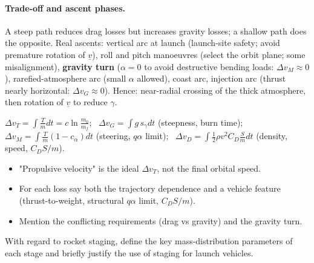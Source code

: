 \paragraph{Trade-off and ascent phases.} A steep path reduces drag losses but increases gravity losses; a shallow path does the
opposite. Real ascents: vertical arc at launch (launch-site safety; avoid premature rotation of $\underline v$), roll and pitch
manoeuvres (select the orbit plane; some misalignment), \textbf{gravity turn} ($\alpha=0$ to avoid destructive bending loads:
$\Delta v_M\approx0$), rarefied-atmosphere arc (small $\alpha$ allowed), coast arc, injection arc (thrust nearly horizontal:
$\Delta v_G\approx0$). Hence: near-radial crossing of the thick atmosphere, then rotation of $\underline v$ to reduce $\gamma$.

\begin{keyf}
$\Delta v_T=\displaystyle\int\frac Tm dt=c\ln\frac{m_0}{m_f}$; \ $\Delta v_G=\displaystyle\int g\,s_\gamma dt$ (steepness, burn time);
\ $\Delta v_M=\displaystyle\int\frac Tm(1-c_\alpha)dt$ (steering, $q\alpha$ limit); \ $\Delta v_D=\displaystyle\int\frac12\rho v^2C_D\frac{S}{m}dt$ (density, speed, $C_DS/m$).
\end{keyf}

\pitfalls
\begin{itemize}
\item "Propulsive velocity" is the ideal $\Delta v_T$, not the final orbital speed.
\item For each loss say both the trajectory dependence and a vehicle feature (thrust-to-weight, structural $q\alpha$ limit, $C_DS/m$).
\item Mention the conflicting requirements (drag vs gravity) and the gravity turn.
\end{itemize}


\begin{qbox}
With regard to rocket staging, define the key mass-distribution parameters of each stage and briefly justify the use of
staging for launch vehicles.
\end{qbox}

